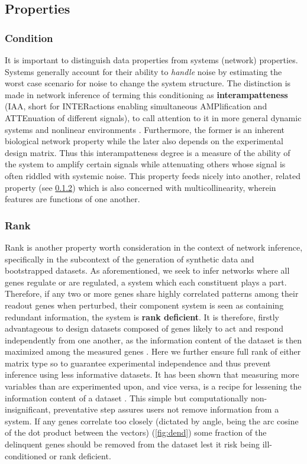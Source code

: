 \subsection{Properties}
\label{sec:prop}
\subsubsection{Condition}
\label{sec:cond}
It is important to distinguish data properties from systems (network) properties. Systems generally account for their ability to \emph{handle} noise by estimating the worst case scenario for noise to change the system structure. The distinction is made in network inference of terming this conditioning as \textbf{interampatteness} (IAA, short for INTERactions enabling simultaneous AMPlification and ATTEnuation of different signals), to call attention to it in more general dynamic systems and nonlinear environments \cite{nordling2009interampatteness}. Furthermore, the former is an inherent biological network property while the later also depends on the experimental design matrix.  Thus this interampatteness degree is a measure of the ability of the system to amplify certain signals while attenuating others whose signal is often riddled with systemic noise. This property feeds nicely into another, related property (see \cref{sec:rank}) which is also concerned with multicollinearity, wherein features are functions of one another.

\subsubsection{Rank}
\label{sec:rank}
Rank is another property worth consideration in the context of network inference, specifically in the subcontext of the generation of synthetic data and bootstrapped datasets. As aforementioned, we seek to infer networks where all genes regulate or are regulated, \ie a system which each constituent plays a part. Therefore, if any two or more genes share highly correlated patterns among their readout genes when perturbed, their component system is seen as containing redundant information, \ie the system is \textbf{rank deficient}. It is therefore, firstly advantageous to design datasets composed of genes likely to act and respond independently from one another, as the information content of the dataset is then maximized among the measured genes \citep{subramanian2017next}. Here we further ensure full rank of either matrix type so to guarantee experimental independence and thus prevent inference using less informative datasets. It has been shown that measuring more variables than are experimented upon, and vice versa, is a recipe for lessening the information content of a dataset \citep{Nordling2013}. This simple but computationally non-insignificant, preventative step assures users not remove information from a system.  If any genes correlate too closely (dictated by angle, being the arc cosine of the dot product between the vectors) (\cref{fig:dend}) some fraction of the delinquent genes should be removed from the dataset lest it risk being ill-conditioned or rank deficient.

